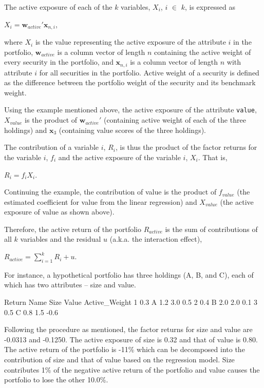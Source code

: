 The active exposure of each of the $k$ variables, $X_{i}$, $i$
$\in$ $k$, is expressed as
\begin{center}
  $X_i = \mathbf{w}_{active}\prime \mathbf{x}_{n,i}$,
\end{center}
where $X_i$ is the value representing the active exposure of the
attribute $i$ in the portfolio, $\mathbf{w}_{active}$ is a column
vector of length $n$ containing the active weight of every security in
the portfolio, and $\mathbf{x}_{n, i}$ is a column vector of length
$n$ with attribute $i$ for all securities in the portfolio. Active
weight of a security is defined as the difference between the
portfolio weight of the security and its benchmark weight.

Using the example mentioned above, the active exposure of the
attribute \texttt{value}, $X_{value}$ is the product of
$\mathbf{w}_{active}\prime$ (containing active weight of each of the
three holdings) and $\mathbf{x}_{3}$ (containing value scores of the
three holdings).

The contribution of a variable $i$, $R_i$, is thus the product of the
factor returns for the variable $i$, $f_i$ and the active exposure of
the variable $i$, $X_i$. That is,
\begin{center}
  $R_i = f_iX_i$.
\end{center}
Continuing the example, the contribution of value is the product of
$f_{value}$ (the estimated coefficient for value from the linear
regression) and $X_{value}$ (the active exposure of value as shown
above).

Therefore, the active return of the portfolio $R_{active}$ is the sum
of contributions of all $k$ variables and the residual $u$
(a.k.a. the interaction effect),
\begin{center}
  $R_{active} = \sum\limits_{i = 1}^kR_i + u$.
\end{center}

For instance, a hypothetical portfolio has three holdings (A, B, and
C), each of which has two attributes -- size and value.

\begin{Schunk}
\begin{Soutput}
  Return Name Size Value Active_Weight
1    0.3    A  1.2   3.0           0.5
2    0.4    B  2.0   2.0           0.1
3    0.5    C  0.8   1.5          -0.6
\end{Soutput}
\end{Schunk}

Following the procedure as mentioned, the factor returns for size and
value are -0.0313 and -0.1250. The active exposure of size is 0.32
and that of value is 0.80. The active return of the portfolio is -11\%
which can be decomposed into the contribution of size and that of
value based on the regression model. Size contributes 1\% of the
negative active return of the portfolio and value causes the portfolio
to lose the other 10.0\%.


